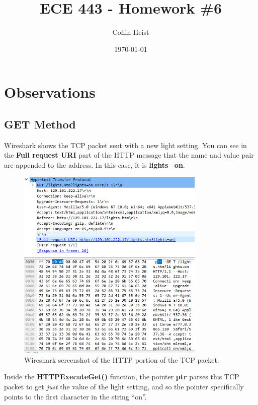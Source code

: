\documentclass[a4paper, 12pt]{article}
\begin{document}
\title{ECE 443 - Homework \#6}
\author{Collin Heist}
\date{\today}
\maketitle


\section{Observations}
\label{sec:observations}

\subsection{GET Method}
\label{sec:get-method}
Wireshark shows the TCP packet sent with a new light setting. You can see in the \textbf{Full request URI} part of the HTTP message that the name and value pair are appended to the address. In this case, it is \textbf{lights=on}.

\begin{figure}[H]
\centering
\includegraphics[width=0.8\textwidth]{img-get-wireshark.PNG}
\caption{Wireshark screenshot of the HTTP portion of the TCP packet.}
\label{fig:img-get-wireshark}
\end{figure}

Inside the \textbf{HTTPExecuteGet()} function, the pointer \textbf{ptr} parses this TCP packet to get \emph{just} the value of the light setting, and so the pointer specifically points to the first character in the string ``on''.
\end{document}
